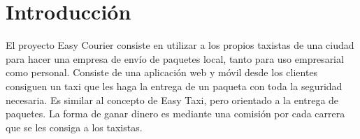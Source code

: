 \chapter*{Introducción}
El proyecto Easy Courier consiste en utilizar a los propios taxistas de una ciudad para hacer una
empresa de envío de paquetes local, tanto para uso empresarial como personal. Consiste de una
aplicación web y móvil desde los clientes consiguen un taxi que les haga la entrega de un paqueta
con toda la seguridad necesaria. Es similar al concepto de Easy Taxi, pero orientado a la entrega de
paquetes. La forma de ganar dinero es mediante una comisión por cada carrera que se les consiga a
los taxistas.